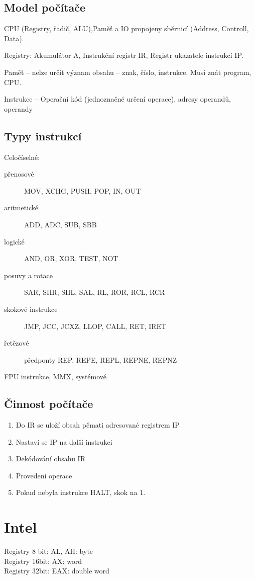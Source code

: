 \documentclass[a4paper, 11pt]{report}
\begin{document}
\subsection{Model počítače}
CPU (Registry, řadič, ALU),Paměť a IO propojeny sběrnicí (Address, Controll, Data).

Registry: Akumulátor A, Instrukční registr IR, Registr ukazatele instrukcí IP.

Paměť -- nelze určit význam obsahu -- znak, číslo, instrukce. Musí znát program, CPU.

Instrukce -- Operační kód (jednoznačné určení operace), adresy operandů, operandy

\subsection{Typy instrukcí}
Celočíselné:
\begin{description}
	\item[přenosové] MOV, XCHG, PUSH, POP, IN, OUT
	\item[aritmetické] ADD, ADC, SUB, SBB
	\item[logické] AND, OR, XOR, TEST, NOT
	\item[posuvy a rotace] SAR, SHR, SHL, SAL, RL, ROR, RCL, RCR
	\item[skokové instrukce] JMP, JCC, JCXZ, LLOP, CALL, RET, IRET
	\item[řetězové] předponty REP, REPE, REPL, REPNE, REPNZ
\end{description}
FPU instrukce, MMX, systémové

\subsection{Činnost počítače}
\begin{enumerate}
	\item Do IR se uloží obsah pěmati adresované registrem IP
	\item Nastaví se IP na další instrukci
	\item Dekódování obsahu IR
	\item Provedení operace
	\item Pokud nebyla instrukce HALT, skok na 1.
\end{enumerate}

\section{Intel}

Registry 8 bit: AL, AH: byte\\
Registry 16bit: AX: word\\
Registry 32bit: EAX: double word
\end{document}
